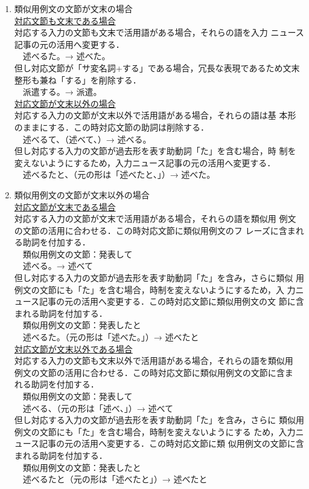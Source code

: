 \documentclass[japanese]{jnlp_1.4}
\begin{document}
\begin{enumerate}
\item 類似用例文の文節が文末の場合\\
\ul{対応文節も文末である場合}\\
対応する入力の文節も文末で活用語がある場合，それらの語を入力
ニュース記事の元の活用へ変更する．\\
　述べるた。→ 述べた。\\
但し対応文節が「サ変名詞+する」である場合，冗長な表現であるため文末
整形も兼ね「する」を削除する．\\
　派遣する。→ 派遣。\\
\ul{対応文節が文末以外の場合}\\
対応する入力の文節が文末以外で活用語がある場合，それらの語は基
本形のままにする．この時対応文節の助詞は削除する．\\
　述べるて、（述べて、）→ 述べる。\\
但し対応する入力の文節が過去形を表す助動詞「た」を含む場合，時
制を変えないようにするため，入力ニュース記事の元の活用へ変更する．\\
　述べるたと、（元の形は「述べたと、」）→ 述べた。

\item 類似用例文の文節が文末以外の場合\\
\ul{対応文節が文末である場合}\\
対応する入力の文節が文末で活用語がある場合，それらの語を類似用
例文の文節の活用に合わせる．この時対応文節に類似用例文のフ
レーズに含まれる助詞を付加する．\\
　類似用例文の文節：発表して\\
　述べる。→ 述べて\\
但し対応する入力の文節が過去形を表す助動詞「た」を含み，さらに類似
用例文の文節にも「た」を含む場合，時制を変えないようにするため，入
力ニュース記事の元の活用へ変更する．この時対応文節に類似用例文の文
節に含まれる助詞を付加する．\\
　類似用例文の文節：発表したと\\
　述べるた。（元の形は「述べた。」）→ 述べたと\\
\ul{対応文節が文末以外である場合}\\
対応する入力の文節も文末以外で活用語がある場合，それらの語を類似用
例文の文節の活用に合わせる．この時対応文節に類似用例文の文節に含ま
れる助詞を付加する．\\
　類似用例文の文節：発表して\\
　述べる、（元の形は「述べ、」）→ 述べて\\
但し対応する入力の文節が過去形を表す助動詞「た」を含み，さらに
類似用例文の文節にも「た」を含む場合，時制を変えないようにする
ため，入力ニュース記事の元の活用へ変更する．この時対応文節に類
似用例文の文節に含まれる助詞を付加する．\\
　類似用例文の文節：発表したと\\
　述べるたと（元の形は「述べたと」）→ 述べたと

\end{enumerate}
\end{document}
